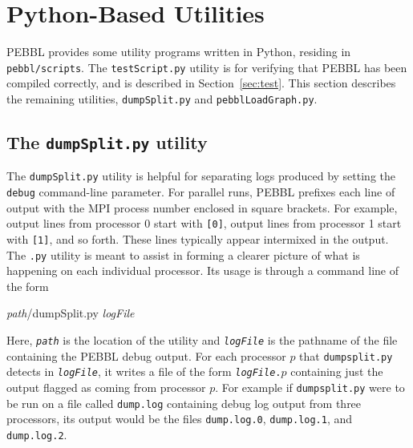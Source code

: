 \section{Python-Based Utilities}
\label{sec:pythonutils}
PEBBL provides some utility programs written in Python, residing in
\texttt{pebbl/scripts}.  The \texttt{testScript.py} utility is for verifying
that PEBBL has been compiled correctly, and is described in
Section~\ref{sec:test}.  This section describes the remaining utilities,
\texttt{dumpSplit.py} and \texttt{pebblLoadGraph.py}.


\subsection{The \texttt{dumpSplit.py} utility}
\label{sec:dumpsplit}
The \texttt{dumpSplit.py} utility is helpful for separating logs produced
by setting the \texttt{debug} command-line parameter.  For parallel
runs, PEBBL prefixes each line of output with the MPI process number
enclosed in square brackets.  For example, output lines from processor
0 start with \texttt{[0]}, output lines from processor 1 start with
\texttt{[1]}, and so forth.  These lines typically appear intermixed
in the output.  The \texttt{.py} utility is meant to assist in
forming a clearer picture of what is happening on each individual
processor.  Its usage is through a command line of the form
\begin{codeblock}
\textit{path}/dumpSplit.py \textit{logFile}
\end{codeblock}
Here, \texttt{\textit{path}} is the location of the utility
and \texttt{\textit{logFile}} is
the pathname of the file containing the PEBBL debug output.  For each
processor $p$ that \texttt{dumpsplit.py} detects in
\texttt{\textit{logFile}}, it writes a file of the form
\texttt{\textit{logFile}.$p$} containing just the output flagged as
coming from processor $p$.  For example if \texttt{dumpsplit.py} were to
be run on a file called \texttt{dump.log} containing debug log output
from three processors, its output would be the files
\texttt{dump.log.0}, \texttt{dump.log.1}, and \texttt{dump.log.2}.


